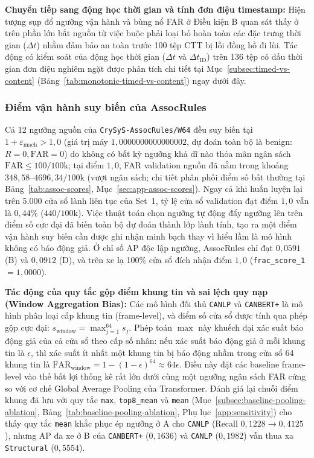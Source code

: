 \documentclass[12pt, a4paper, reqno, oneside]{book}
\DeclareRobustCommand{\code}[1]{\nolinkurl{#1}}
\begin{document}
\noindent\textbf{Chuyển tiếp sang động học thời gian và tính đơn điệu timestamp:} Hiện tượng sụp đổ ngưỡng vận hành và bùng nổ FAR ở Điều kiện B quan sát thấy ở trên phần lớn bắt nguồn từ việc buộc phải loại bỏ hoàn toàn các đặc trưng thời gian ($\Delta t$) nhằm đảm bảo an toàn trước 100 tệp CTT bị lỗi đồng hồ đi lùi. Tác động có kiểm soát của động học thời gian ($\Delta t$ và $\Delta t_{\text{ID}}$) trên 136 tệp có dấu thời gian đơn điệu nghiêm ngặt được phân tích chi tiết tại Mục~\ref{subsec:timed-vs-content} (Bảng~\ref{tab:monotonic-timed-vs-content}) ngay dưới đây.

\subsubsection{Điểm vận hành suy biến của AssocRules}\label{subsec:assoc-degenerate}
Cả 12 ngưỡng nguồn của \code{CrySyS-AssocRules/W64} đều suy biến tại $1 + \varepsilon_{\text{mach}} > 1{,}0$ (giá trị máy $1{,}0000000000000002$, dự đoán toàn bộ là benign: $R=0, \text{FAR}=0$) do không có bất kỳ ngưỡng khả dĩ nào thỏa mãn ngân sách $\text{FAR} \le 100/100\text{k}$; tại điểm $1{,}0$, FAR validation nguồn đã nằm trong khoảng $348{,}58\text{--}4696{,}34/100\text{k}$ (vượt ngân sách; chi tiết phân phối điểm số bất thường tại Bảng~\ref{tab:assoc-scores}, Mục~\ref{sec:app-assoc-scores}). Ngay cả khi huấn luyện lại trên 5.000 cửa sổ lành liên tục của Set~1, tỷ lệ cửa sổ validation đạt điểm $1{,}0$ vẫn là $0{,}44\%$ ($440/100\text{k}$). Việc thuật toán chọn ngưỡng tự động đẩy ngưỡng lên trên điểm số cực đại đã biến toàn bộ dự đoán thành lớp lành tính, tạo ra một điểm vận hành suy biến cần được ghi nhận minh bạch thay vì hiểu lầm là mô hình không có báo động giả. Ở chỉ số AP độc lập ngưỡng, AssocRules chỉ đạt $0{,}0591$ (B) và $0{,}0912$ (D), và trên xe lạ 100\% cửa sổ đích nhận điểm $1{,}0$ (\code{frac\_score\_1} $=1{,}0000$).

\noindent\textbf{Tác động của quy tắc gộp điểm khung tin và sai lệch quy nạp (Window Aggregation Bias):} Các mô hình đối thủ \code{CANLP} và \code{CANBERT+} là mô hình phân loại cấp khung tin (frame-level), và điểm số cửa sổ được tính qua phép gộp cực đại: $s_{\text{window}} = \max_{j=1}^{64} s_j$. Phép toán $\max$ này khuếch đại xác suất báo động giả của cả cửa sổ theo cấp số nhân: nếu xác suất báo động giả ở mỗi khung tin là $\epsilon$, thì xác suất ít nhất một khung tin bị báo động nhầm trong cửa sổ 64 khung tin là $\text{FAR}_{\text{window}} = 1 - (1 - \epsilon)^{64} \approx 64\epsilon$. Điều này đặt các baseline frame-level vào thế bất lợi thống kê rất lớn dưới cùng một ngưỡng ngân sách FAR cứng so với cơ chế Global Average Pooling của Transformer. Đánh giá lại chuỗi điểm khung đã lưu với quy tắc \code{max}, \code{top8\_mean} và \code{mean} (Mục~\ref{subsec:baseline-pooling-ablation}, Bảng~\ref{tab:baseline-pooling-ablation}, Phụ lục~\ref{app:sensitivity}) cho thấy quy tắc \code{mean} khắc phục ép ngưỡng ở A cho \code{CANLP} (Recall $0{,}1228 \to 0{,}4125$), nhưng AP đa xe ở B của \code{CANBERT+} ($0{,}1636$) và \code{CANLP} ($0{,}1982$) vẫn thua xa \code{Structural} ($0{,}5554$).
\end{document}
